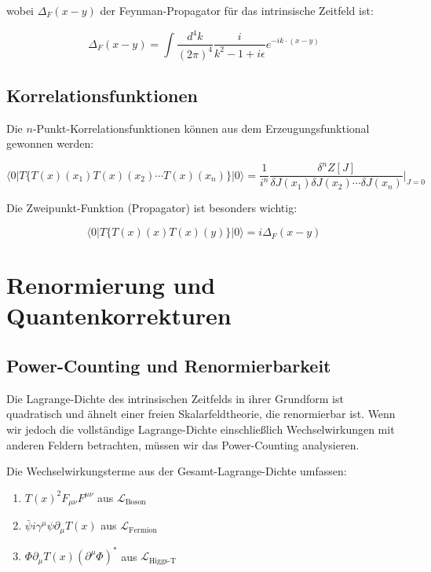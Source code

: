 \documentclass[12pt,a4paper]{article}
\newcommand{\Tfield}{T(x)}
\newcommand{\calL}{\mathcal{L}}
\begin{document}
	wobei $\Delta_F(x-y)$ der Feynman-Propagator für das intrinsische Zeitfeld ist:
	
	\begin{equation}
		\Delta_F(x-y) = \int \frac{d^4k}{(2\pi)^4} \frac{i}{k^2 - 1 + i\epsilon} e^{-ik \cdot (x-y)}
	\end{equation}
	
	\subsection{Korrelationsfunktionen}
	\label{sec:korrelationsfunktionen}
	
	Die $n$-Punkt-Korrelationsfunktionen können aus dem Erzeugungsfunktional gewonnen werden:
	
	\begin{equation}
		\langle 0|T\{\Tfield(x_1)\Tfield(x_2)\cdots \Tfield(x_n)\}|0 \rangle = \frac{1}{i^n}\frac{\delta^n Z[J]}{\delta J(x_1) \delta J(x_2) \cdots \delta J(x_n)}\bigg|_{J=0}
	\end{equation}
	
	Die Zweipunkt-Funktion (Propagator) ist besonders wichtig:
	
	\begin{equation}
		\langle 0|T\{\Tfield(x)\Tfield(y)\}|0 \rangle = i\Delta_F(x-y)
	\end{equation}
	
	\section{Renormierung und Quantenkorrekturen}
	\label{sec:renormierung}
	
	\subsection{Power-Counting und Renormierbarkeit}
	\label{sec:power_counting}
	
	Die Lagrange-Dichte des intrinsischen Zeitfelds in ihrer Grundform ist quadratisch und ähnelt einer freien Skalarfeldtheorie, die renormierbar ist. Wenn wir jedoch die vollständige Lagrange-Dichte einschließlich Wechselwirkungen mit anderen Feldern betrachten, müssen wir das Power-Counting analysieren.
	
	Die Wechselwirkungsterme aus der Gesamt-Lagrange-Dichte umfassen:
	
	\begin{enumerate}
		\item $\Tfield^2 F_{\mu\nu}F^{\mu\nu}$ aus $\calL_{\text{Boson}}$
		\item $\bar{\psi}i\gamma^{\mu}\psi\partial_{\mu}\Tfield$ aus $\calL_{\text{Fermion}}$
		\item $\Phi\partial_{\mu}\Tfield(\partial^{\mu}\Phi)^*$ aus $\calL_{\text{Higgs-T}}$
	\end{enumerate}
	
\end{document}
